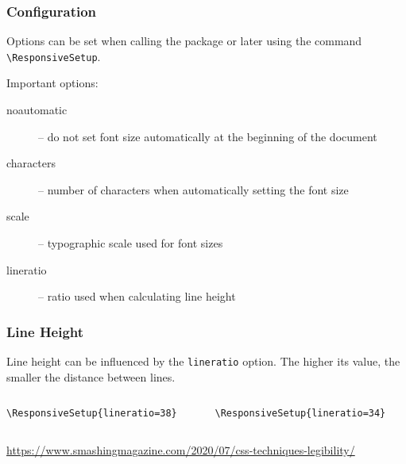\begin{frame}[fragile]
  \frametitle{Configuration}
  Options can be set when calling the package or later using the command \verb|\ResponsiveSetup|.

  Important options:

  \begin{description}
    \item[noautomatic] -- do not set font size automatically at the beginning of the document
    \item[characters] -- number of characters when automatically setting the font size
    \item[scale] -- typographic scale used for font sizes
    \item[lineratio] -- ratio used when calculating line height
  \end{description}

\end{frame}

\begin{frame}[fragile]
  \frametitle{Line Height}
  Line height can be influenced by the \texttt{lineratio} option. 
The higher its value, the smaller the distance between lines.

\begin{columns}
  \begin{column}{0.5\textwidth}
\begin{verbatim}
\ResponsiveSetup{lineratio=38}
\end{verbatim}

\end{column}
  \begin{column}{0.5\textwidth}
\begin{verbatim}
\ResponsiveSetup{lineratio=34}
\end{verbatim}

\end{column}
\end{columns}
\url{https://www.smashingmagazine.com/2020/07/css-techniques-legibility/}

\end{frame}


